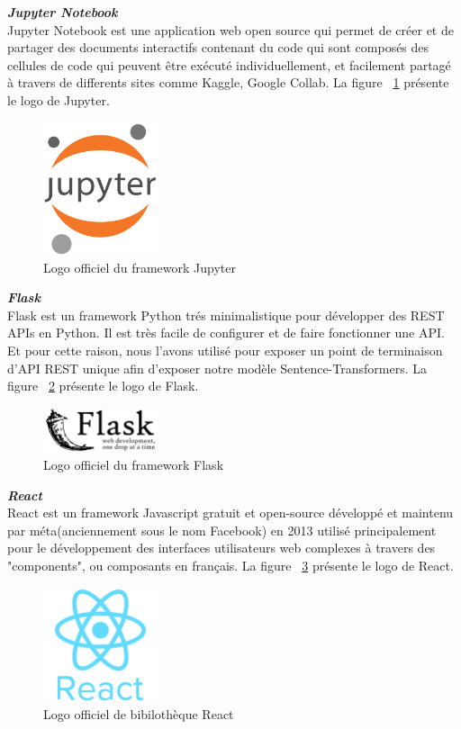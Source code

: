 \noindent
{\small\textbf{\textit{Jupyter Notebook}}}\mbox{}\\
Jupyter Notebook est une application web open source qui permet de créer et de partager des documents interactifs contenant du code qui sont composés des cellules de code qui peuvent être exécuté individuellement, et facilement partagé à travers de differents sites comme Kaggle, Google Collab. La figure ~\ref{fig:jupyter} présente le logo de Jupyter.
\begin{figure}[H]
\centering
\includegraphics[width=0.3\textwidth]{logos/jupyter.png}
\caption{Logo officiel du framework Jupyter}
\label{fig:jupyter}
\end{figure}


\noindent
{\small\textbf{\textit{Flask}}}\mbox{}\\
Flask est un framework Python trés minimalistique pour développer des REST APIs en Python. Il est très facile de configurer et de faire fonctionner une API. Et pour cette raison, nous l'avons utilisé pour exposer un point de terminaison d'API REST unique afin d'exposer notre modèle Sentence-Transformers. La figure ~\ref{fig:flask} présente le logo de Flask.
\begin{figure}[H]
\centering
\includegraphics[width=0.3\textwidth]{logos/flask.png}
\caption{Logo officiel du framework Flask}
\label{fig:flask}
\end{figure}


\noindent
{\small\textbf{\textit{React}}}\mbox{}\\
React est un framework Javascript gratuit et open-source développé et maintenu par méta(anciennement sous le nom Facebook) en 2013 utilisé principalement pour le développement des interfaces utilisateurs web complexes à travers des "components", ou composants en français. La figure ~\ref{fig:react} présente le logo de React.
\begin{figure}[H]
\centering
\includegraphics[width=0.3\textwidth]{logos/react.png}
\caption{Logo officiel de bibilothèque React}
\label{fig:react}
\end{figure}

